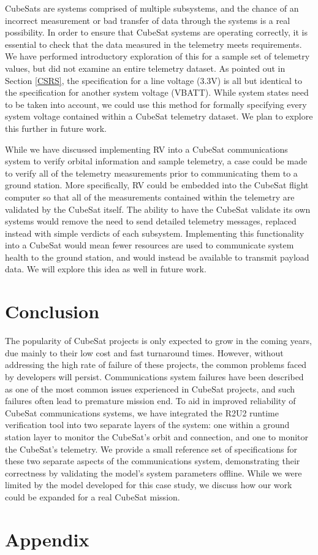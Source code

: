 \documentclass[conf]{new-aiaa}
\begin{document}
CubeSats are systems comprised of multiple subsystems, and the chance of an incorrect measurement or bad transfer of data through the systems is a real possibility. In order to ensure that CubeSat systems are operating correctly, it is essential to check that the data measured in the telemetry meets requirements. We have performed introductory exploration of this for a sample set of telemetry values, but did not examine an entire telemetry dataset. As pointed out in Section \ref{CSRS}, the specification for a line voltage (3.3V) is all but identical to the specification for another system voltage (VBATT). While system states need to be taken into account,%
we could use this method for formally specifying every system voltage contained within a CubeSat telemetry dataset. We plan to explore this further in future work.

While we have discussed implementing RV into a CubeSat communications system to verify orbital information and sample telemetry, a case could be made to verify all of the telemetry measurements prior to communicating them to a ground station. More specifically, RV could be embedded into the CubeSat flight computer so that all of the measurements contained within the telemetry are validated by the CubeSat itself. The ability to have the CubeSat validate its own systems would remove the need to send detailed telemetry messages, replaced instead with simple verdicts of each subsystem. Implementing this functionality into a CubeSat would mean fewer resources are used to communicate system health to the ground station, and would instead be available to transmit payload data. We will explore this idea as well in future work.


\section{Conclusion}  \label{Conclusion}

The popularity of CubeSat projects is only expected to grow in the coming years, due mainly to their low cost and fast turnaround times. However, without addressing the high rate of failure of these projects, the common problems faced by developers will persist. Communications system failures have been described as one of the most common issues experienced in CubeSat projects, and such failures often lead to premature mission end. To aid in improved reliability of CubeSat communications systems, we have integrated the R2U2 runtime verification tool into two separate layers of the system: one within a ground station layer to monitor the CubeSat's orbit and connection, and one to monitor the CubeSat's telemetry. We provide a small reference set of specifications for these two separate aspects of the communications system, demonstrating their correctness by validating the model's system parameters offline. While we were limited by the model developed for this case study, we discuss how our work could be expanded for a real CubeSat mission.

\newpage
\section*{Appendix}



\end{document}
